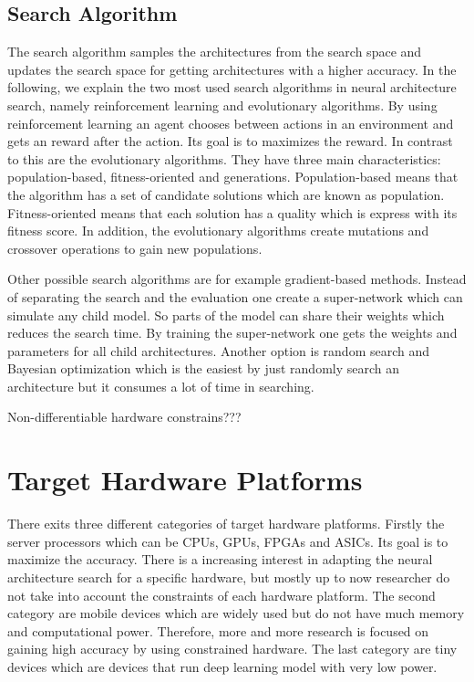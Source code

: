 \documentclass[conference]{IEEEtran}
\begin{document}
\subsection{Search Algorithm}
The search algorithm samples the architectures from the search space and updates the search space for getting architectures with a higher accuracy.
In the following, we explain the two most used search algorithms in neural architecture search, namely reinforcement learning and evolutionary algorithms. By using reinforcement learning an agent chooses between actions in an environment and gets an reward after the action. Its goal is to maximizes the reward. In contrast to this are the evolutionary algorithms. They have three main characteristics: population-based, fitness-oriented and generations. Population-based means that the algorithm has a set of candidate solutions which are known as population. Fitness-oriented means that each solution has a quality which is express with its fitness score. In addition, the evolutionary algorithms create mutations and crossover operations to gain new populations.

Other possible search algorithms are for example gradient-based methods. Instead of separating the search and the evaluation one create a super-network which can simulate any child model. So parts of the model can share their weights which reduces the search time. By training the super-network one gets the weights and parameters for all child architectures. Another option is random search and Bayesian optimization which is the easiest by just randomly search an architecture but it consumes a lot of time in searching. 

Non-differentiable hardware constrains???

\section{Target Hardware Platforms}
There exits three different categories of target hardware platforms. Firstly the server processors which can be CPUs, GPUs, FPGAs and ASICs. Its goal is to maximize the accuracy. There is a increasing interest in adapting the neural architecture search for a specific hardware, but mostly up to now researcher do not take into account the constraints of each hardware platform. The second category are mobile devices which are widely used but do not have much memory and computational power. Therefore, more and more research is focused on gaining high accuracy by using constrained hardware. The last category are tiny devices which are devices that run deep learning model with very low power. 
\end{document}
